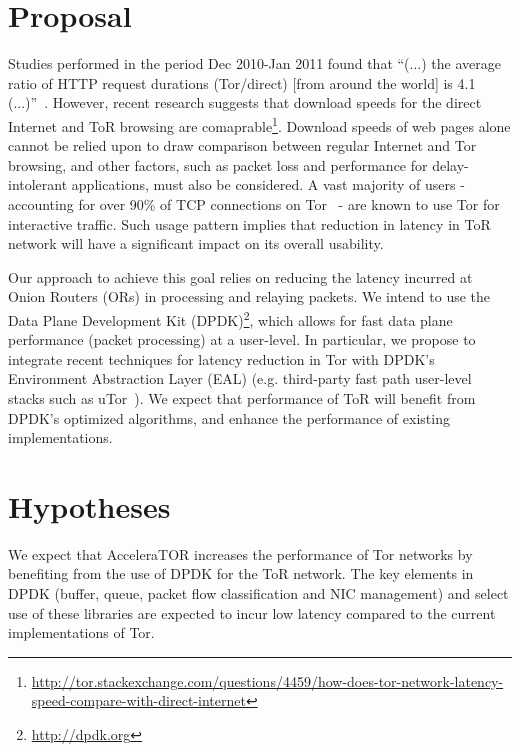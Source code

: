 \documentclass[conference]{IEEEtran}
\begin{document}
\section{Proposal}

 
Studies performed in the period Dec 2010-Jan 2011 found that ``(...) the average ratio of HTTP request durations (Tor/direct) [from around the world] is 4.1 (...)''~\cite{fi4020488}. However, recent research suggests that  download speeds for the direct Internet and ToR browsing are comaprable\footnote{\label{note1}\url{http://tor.stackexchange.com/questions/4459/how-does-tor-network-latency-speed-compare-with-direct-internet}}. Download speeds of web pages alone cannot be relied upon to draw comparison between regular Internet and Tor browsing, and other factors, such as packet loss and performance for delay-intolerant applications,  must also be considered. A vast majority of users - accounting for over 90\% of TCP connections on Tor~\cite{Mccoy:2008:SLD:1428259.1428264} - are known to use Tor for interactive traffic. Such usage pattern implies that reduction in  latency in ToR network will have a significant impact on its overall usability. 

Our approach to achieve this goal relies on reducing the latency incurred at  Onion Routers (ORs) in processing and relaying packets.  We intend to  use  the Data Plane Development Kit (DPDK)\footnote{\url{http://dpdk.org}}, which allows for fast data plane performance (packet processing) at a user-level. In particular, we propose to integrate recent techniques for latency reduction in Tor with DPDK’s Environment Abstraction Layer (EAL) (e.g. third-party fast path user-level stacks such as uTor~\cite{179191}). We expect that performance of ToR will benefit from DPDK's optimized algorithms, and enhance the performance of existing implementations.


\section{Hypotheses}
We expect that AcceleraTOR increases the performance of Tor networks by benefiting from the use of DPDK for the ToR network. The key elements in DPDK (buffer, queue, packet flow classification and NIC management) and select use of these libraries are expected to incur low latency compared to the current implementations of Tor.
\end{document}
